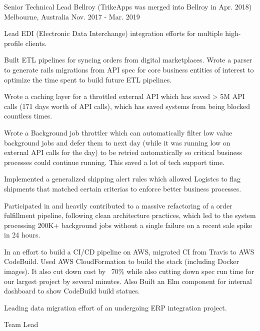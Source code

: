 \begin{cventries}
  \cventry
    {Senior Technical Lead} %
    {Bellroy (TrikeApps was merged into Bellroy in Apr. 2018)} %
    {Melbourne, Australia} %
    {Nov. 2017 - Mar. 2019} %
    {
      \begin{cvitems} %
        \item {Lead EDI (Electronic Data Interchange) integration efforts for multiple high-profile clients.}
        \item {Built ETL pipelines for syncing orders from digital marketplaces. Wrote a parser to generate rails migrations from API spec for core business entities of interest to optimize the time spent to build future ETL pipelines.}
        \item {Wrote a caching layer for a throttled external API which has saved > 5M API calls (171 days worth of API calls), which has saved systems from being blocked countless times.}
        \item {Wrote a Background job throttler which can automatically filter low value background jobs and defer them to next day (while it was running low on external API calls for the day) to be retried automatically so critical business processes could continue running. This saved a lot of tech support time.}
        \item {Implemented a generalized shipping alert rules which allowed Logistcs to flag shipments that matched certain criterias to enforce better business processes.}
        \item {Participated in and heavily contributed to a massive refactoring of a order fulfillment pipeline, following clean architecture practices, which led to the system processing 200K+ background jobs without a single failure on a recent sale spike in 24 hours.}
        \item {In an effort to build a CI/CD pipeline on AWS, migrated CI from Travis to AWS CodeBuild. Used AWS CloudFormation to build the stack (including Docker images). It also cut down cost by ~70\% while also cutting down spec run time for our largest project by several minutes. Also Built an Elm component for internal dashboard to show CodeBuild build statues.}
        \item {Leading data migration effort of an undergoing ERP integration project.}
      \end{cvitems}
    }
  \cventry
    {Team Lead} %

\end{cventries}
